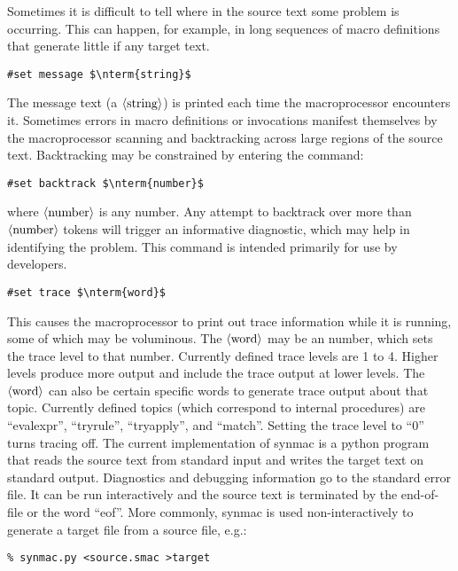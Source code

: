 \documentclass[12pt]{article}
\begin{document}
Sometimes it is difficult to tell where in the source text some problem is occurring.
This can happen, for example, in long sequences of macro definitions that generate little if any target text.
\begin{lstlisting}[frame=single,mathescape]
#set message $\nterm{string}$
\end{lstlisting}
The message text (a $\langle\mbox{string}\rangle$) is printed each time the macroprocessor encounters it.
Sometimes errors in macro definitions or invocations manifest themselves by the macroprocessor scanning and backtracking across large regions of the source text.
Backtracking may be constrained by entering the command:
\begin{lstlisting}[frame=single,mathescape]
#set backtrack $\nterm{number}$
\end{lstlisting}
where $\langle\mbox{number}\rangle$ is any number. 
Any attempt to backtrack over more than $\langle\mbox{number}\rangle$ tokens will trigger an informative diagnostic, which may help in identifying the problem.
This command is intended primarily for use by developers.
\begin{lstlisting}[frame=single,mathescape]
#set trace $\nterm{word}$
\end{lstlisting}
This causes the macroprocessor to print out trace information while it is running, some of which may be voluminous.
The $\langle\mbox{word}\rangle$ may be an number, which sets the trace level to that number. 
Currently defined trace levels are 1 to 4.
Higher levels produce more output and include the trace output at lower levels.
The $\langle\mbox{word}\rangle$ can also be certain specific words to generate trace output about that topic.
Currently defined topics (which correspond to internal procedures) are 
``evalexpr'', ``tryrule'', ``tryapply'', and ``match''.
Setting the trace level to ``0'' turns tracing off.
The current implementation of synmac is a python program that reads the source text from standard input and writes the target text on standard output.
Diagnostics and debugging information go to the standard error file.
It can be run interactively and the source text is terminated by the end-of-file or the word ``eof''.
More commonly, synmac is used non-interactively to generate a target file from a source file, e.g.:
\begin{verbatim}
% synmac.py <source.smac >target
\end{verbatim}
\end{document}
